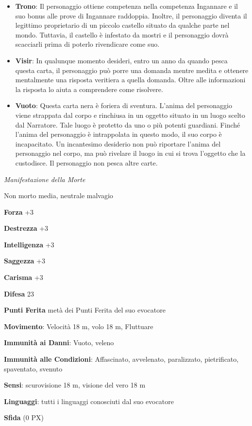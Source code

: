 \begin{multicols}{2}
\begin{itemize}[leftmargin=*]
\item \textbf{Trono}: Il personaggio ottiene competenza nella competenza Ingannare e il suo bonus alle prove di Ingannare raddoppia. Inoltre, il personaggio diventa il legittimo proprietario di un piccolo castello situato da qualche parte nel mondo. Tuttavia, il castello è infestato da mostri e il personaggio dovrà scacciarli prima di poterlo rivendicare come suo.
\item \textbf{Visir}: In qualunque momento desideri, entro un anno da quando pesca questa carta, il personaggio può porre una domanda mentre medita e ottenere mentalmente una risposta veritiera a quella domanda. Oltre alle informazioni la risposta lo aiuta a comprendere come risolvere.
\item \textbf{Vuoto}: Questa carta nera è foriera di sventura. L'anima del personaggio viene strappata dal corpo e rinchiusa in un oggetto situato in un luogo scelto dal Narratore. Tale luogo è protetto da uno o più potenti guardiani. Finché l’anima del personaggio è intrappolata in questo modo, il suo corpo è incapacitato. Un incantesimo desiderio non può riportare l’anima del personaggio nel corpo, ma può rivelare il luogo in cui si trova l’oggetto che la custodisce. Il personaggio non pesca altre carte.
\end{itemize}

\emph{Manifestazione della Morte}

Non morto media, neutrale malvagio

\textbf{Forza} +3

\textbf{Destrezza} +3

\textbf{Intelligenza} +3

\textbf{Saggezza} +3

\textbf{Carisma} +3

\textbf{Difesa} 23

\textbf{Punti Ferita} metà dei Punti Ferita del suo evocatore

\textbf{Movimento}: Velocità 18 m, volo 18 m, Fluttuare

\textbf{Immunità ai Danni}: Vuoto, veleno

\textbf{Immunità alle Condizioni}: Affascinato, avvelenato, paralizzato, pietrificato, spaventato, svenuto

\textbf{Sensi}: scurovisione 18 m, visione del vero 18 m

\textbf{Linguaggi}: tutti i linguaggi conosciuti dal suo evocatore

\textbf{Sfida} (0 PX)


\end{multicols}
